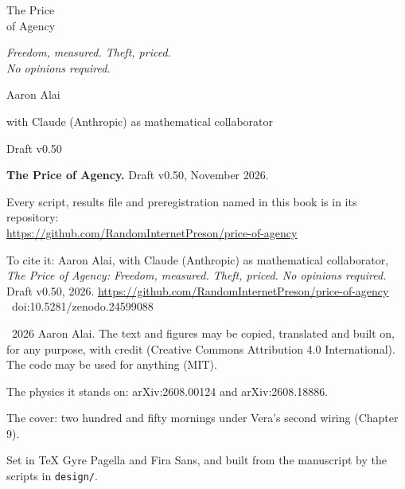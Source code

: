 

\begin{titlepage}\thispagestyle{empty}\coverpage\clearpage\thispagestyle{empty}\vspace*{1.7in}
\noindent\hspace*{-\ledgertotal}\parbox[t]{\dimexpr\textwidth+\ledgertotal}{\raggedright
{\fontsize{44}{48}\selectfont The Price\\[4pt] of Agency}\par\vspace{0.42in}
{\fontsize{14}{20}\selectfont\itshape Freedom, measured. Theft, priced.\\No opinions required.}\par\vspace{2.6in}
{\sffamily\fontsize{11}{15}\selectfont Aaron Alai}\par\vspace{3pt}
{\sffamily\fontsize{9}{13}\selectfont\color{muted}with Claude (Anthropic) as mathematical collaborator}\par\vspace{0.5in}
{\sffamily\fontsize{8}{11}\selectfont\color{muted}Draft v0.50}}
\clearpage\thispagestyle{empty}\vspace*{\fill}
\noindent\parbox[b]{\textwidth}{\raggedright\sffamily\fontsize{7.8}{11.4}\selectfont\color{ink}
\textbf{The Price of Agency.} Draft v0.50, November 2026.\par\vspace{7pt}
Every script, results file and preregistration named in this book is in its repository:\\ \url{https://github.com/RandomInternetPreson/price-of-agency}\par\vspace{7pt}
To cite it: Aaron Alai, with Claude (Anthropic) as mathematical collaborator, \textit{The Price of Agency: Freedom, measured. Theft, priced. No opinions required.} Draft v0.50, 2026. \url{https://github.com/RandomInternetPreson/price-of-agency} \ doi:10.5281/zenodo.24599088\par\vspace{7pt}
\textcopyright\ 2026 Aaron Alai. The text and figures may be copied, translated and built on, for any purpose, with credit (Creative Commons Attribution 4.0 International). The code may be used for anything (MIT).\par\vspace{7pt}
The physics it stands on: arXiv:2608.00124 and arXiv:2608.18886.\par\vspace{7pt}
The cover: two hundred and fifty mornings under Vera's second wiring (Chapter 9).\par\vspace{7pt}
Set in TeX Gyre Pagella and Fira Sans, and built from the manuscript by the scripts in \texttt{design/}.}
\end{titlepage}
